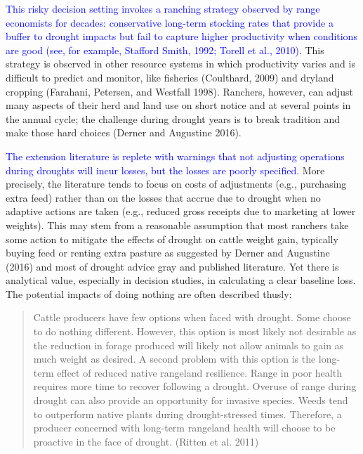 \documentclass[11pt]{article}
\begin{document}
\textcolor{blue}{This risky decision setting invokes a ranching strategy observed by range economists for decades: conservative long-term stocking rates that provide a buffer to drought impacts but fail to capture higher productivity when conditions are good (see, for example, Stafford Smith, 1992; Torell et al., 2010).} This strategy is observed in other resource systems in which productivity varies and is difficult to predict and monitor, like fisheries (Coulthard, 2009) and dryland cropping (Farahani, Petersen, and Westfall 1998). Ranchers, however, can adjust many aspects of their herd and land use on short notice and at several points in the annual cycle; the challenge during drought years is to break tradition and make those hard choices (Derner and Augustine 2016). 

\textcolor{blue}{The extension literature is replete with warnings that not adjusting operations during droughts will incur losses, but the losses are poorly specified.} 
More precisely, the literature tends to focus on costs of adjustments (e.g., purchasing extra feed) rather than on the losses that accrue due to drought when no adaptive actions are taken (e.g., reduced gross receipts due to marketing at lower weights). This may stem from a reasonable assumption that most ranchers take some action to mitigate the effects of drought on cattle weight gain, typically buying feed or renting extra pasture as suggested by Derner and Augustine (2016) and most of drought advice gray and published literature. Yet there is analytical value, especially in decision studies, in calculating a clear baseline loss. The potential impacts of doing nothing are often described thusly:

\begin{quote}
Cattle producers have few options when faced with drought. Some choose to do nothing different. However, this option is most likely not desirable as the reduction in forage produced will likely not allow animals to gain as much weight as desired. A second problem with this option is the long-term effect of reduced native rangeland resilience. Range in poor health requires more time to recover following a drought. Overuse of range during drought can also provide an opportunity for invasive species. Weeds tend to outperform native plants during drought-stressed times. Therefore, a producer concerned with long-term rangeland health will choose to be proactive in the face of drought. (Ritten et al. 2011)
\end{quote}
\end{document}
